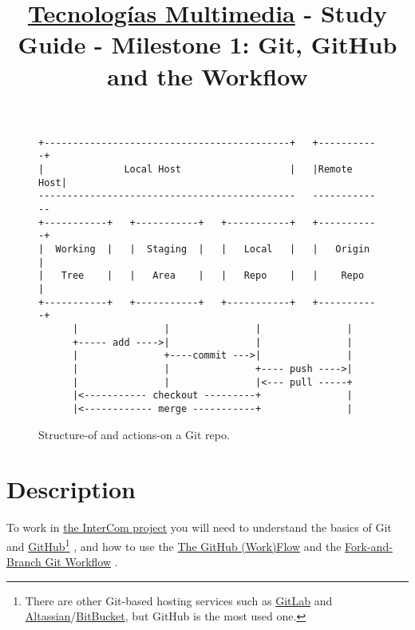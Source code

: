 \title{\href{https://www.ual.es/estudios/grados/presentacion/plandeestudios/asignatura/4015/40154321?idioma=zh_CN}{Tecnologías Multimedia} - Study Guide - Milestone 1: Git, GitHub and the Workflow}

\maketitle

\begin{figure}
\begin{verbatim}
+-------------------------------------------+   +-----------+
|              Local Host                   |   |Remote Host|
---------------------------------------------   -------------
+-----------+   +-----------+   +-----------+   +-----------+
|  Working  |   |  Staging  |   |   Local   |   |   Origin  |
|   Tree    |   |   Area    |   |   Repo    |   |    Repo   |
+-----------+   +-----------+   +-----------+   +-----------+
      |               |               |               |
      +----- add ---->|               |               |
      |               +----commit --->|               |
      |               |               +---- push ---->|
      |               |               |<--- pull -----+
      |<----------- checkout ---------+               |
      |<------------ merge -----------+               |
\end{verbatim}
\caption{Structure-of and actions-on a Git repo.}
\label{fig:local_repo_structure_and_actions}
\end{figure}

\section{Description}

To work in
\href{https://github.com/Tecnologias-multimedia/intercom}{the InterCom
  project} \cite{intercom} you will need to understand the basics of
Git \cite{Git-book} and
\href{https://github.com/}{GitHub}\footnote{There are other Git-based
hosting services such as \href{https://about.gitlab.com/}{GitLab} and
\href{https://www.atlassian.com/git}{Altassian}/\href{https://bitbucket.org/product}{BitBucket},
but GitHub is the most used one.} \cite{GitHub}, and how to use the
\href{https://guides.github.com/introduction/flow/index.html}{The
  GitHub (Work)Flow} and the
\href{https://github.com/vicente-gonzalez-ruiz/fork_and_branch_git_workflow}{Fork-and-Branch
  Git Workflow} \cite{fork-and-branch-git-workflow}.


